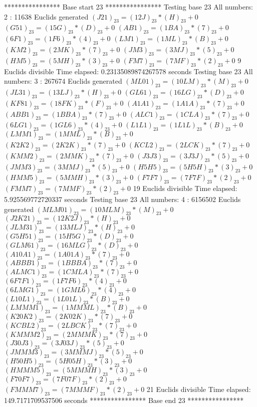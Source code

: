**************** Base start 23 ****************
Testing base 23 All numbers: 2 :
	 11638 Euclids generated
	$(J21)_{23}=(12J)_{23}*(H)_{23}+0$
	$(G51)_{23}=(15G)_{23}*(D)_{23}+0$
	$(AB1)_{23}=(1BA)_{23}*(7)_{23}+0$
	$(6F1)_{23}=(1F6)_{23}*(4)_{23}+0$
	$(LM1)_{23}=(1ML)_{23}*(B)_{23}+0$
	$(KM2)_{23}=(2MK)_{23}*(7)_{23}+0$
	$(JM3)_{23}=(3MJ)_{23}*(5)_{23}+0$
	$(HM5)_{23}=(5MH)_{23}*(3)_{23}+0$
	$(FM7)_{23}=(7MF)_{23}*(2)_{23}+0$
	 9 Euclids divisible
Time elapsed: 0.23135089874267578 seconds
Testing base 23 All numbers: 3 :
	 267674 Euclids generated
	$(ML01)_{23}=(10LM)_{23}*(M)_{23}+0$
	$(JL31)_{23}=(13LJ)_{23}*(H)_{23}+0$
	$(GL61)_{23}=(16LG)_{23}*(D)_{23}+0$
	$(KF81)_{23}=(18FK)_{23}*(F)_{23}+0$
	$(A1A1)_{23}=(1A1A)_{23}*(7)_{23}+0$
	$(ABB1)_{23}=(1BBA)_{23}*(7)_{23}+0$
	$(ALC1)_{23}=(1CLA)_{23}*(7)_{23}+0$
	$(6LG1)_{23}=(1GL6)_{23}*(4)_{23}+0$
	$(L1L1)_{23}=(1L1L)_{23}*(B)_{23}+0$
	$(LMM1)_{23}=(1MML)_{23}*(B)_{23}+0$
	$(K2K2)_{23}=(2K2K)_{23}*(7)_{23}+0$
	$(KCL2)_{23}=(2LCK)_{23}*(7)_{23}+0$
	$(KMM2)_{23}=(2MMK)_{23}*(7)_{23}+0$
	$(J3J3)_{23}=(3J3J)_{23}*(5)_{23}+0$
	$(JMM3)_{23}=(3MMJ)_{23}*(5)_{23}+0$
	$(H5H5)_{23}=(5H5H)_{23}*(3)_{23}+0$
	$(HMM5)_{23}=(5MMH)_{23}*(3)_{23}+0$
	$(F7F7)_{23}=(7F7F)_{23}*(2)_{23}+0$
	$(FMM7)_{23}=(7MMF)_{23}*(2)_{23}+0$
	 19 Euclids divisible
Time elapsed: 5.925569772720337 seconds
Testing base 23 All numbers: 4 :
	 6156502 Euclids generated
	$(MLM01)_{23}=(10MLM)_{23}*(M)_{23}+0$
	$(J2K21)_{23}=(12K2J)_{23}*(H)_{23}+0$
	$(JLM31)_{23}=(13MLJ)_{23}*(H)_{23}+0$
	$(G5H51)_{23}=(15H5G)_{23}*(D)_{23}+0$
	$(GLM61)_{23}=(16MLG)_{23}*(D)_{23}+0$
	$(A10A1)_{23}=(1A01A)_{23}*(7)_{23}+0$
	$(ABBB1)_{23}=(1BBBA)_{23}*(7)_{23}+0$
	$(ALMC1)_{23}=(1CMLA)_{23}*(7)_{23}+0$
	$(6F7F1)_{23}=(1F7F6)_{23}*(4)_{23}+0$
	$(6LMG1)_{23}=(1GML6)_{23}*(4)_{23}+0$
	$(L10L1)_{23}=(1L01L)_{23}*(B)_{23}+0$
	$(LMMM1)_{23}=(1MMML)_{23}*(B)_{23}+0$
	$(K20K2)_{23}=(2K02K)_{23}*(7)_{23}+0$
	$(KCBL2)_{23}=(2LBCK)_{23}*(7)_{23}+0$
	$(KMMM2)_{23}=(2MMMK)_{23}*(7)_{23}+0$
	$(J30J3)_{23}=(3J03J)_{23}*(5)_{23}+0$
	$(JMMM3)_{23}=(3MMMJ)_{23}*(5)_{23}+0$
	$(H50H5)_{23}=(5H05H)_{23}*(3)_{23}+0$
	$(HMMM5)_{23}=(5MMMH)_{23}*(3)_{23}+0$
	$(F70F7)_{23}=(7F07F)_{23}*(2)_{23}+0$
	$(FMMM7)_{23}=(7MMMF)_{23}*(2)_{23}+0$
	 21 Euclids divisible
Time elapsed: 149.7171709537506 seconds
**************** Base end 23 ****************

